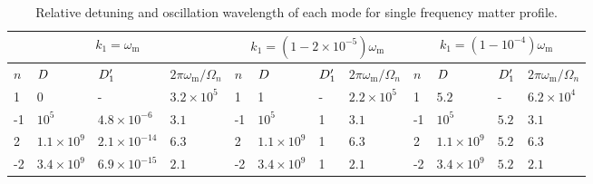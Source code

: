 


\begin{table}
\centering
\small
\setlength\tabcolsep{2pt}
\begin{tabular}{llll|llll|llll}
\hline
 \multicolumn{4}{c|}{$k_1=\omega_{\mathrm m}$} & \multicolumn{4}{c|}{$k_1=(1-2\times 10^{-5})\omega_{\mathrm{m}}$} & \multicolumn{4}{c}{$k_1=(1-10^{-4})\omega_{\mathrm m}$} \\
\hline
   $n$ & $D$ & $D'_1$  & $2\pi\omega_{\mathrm m}/\Omega_n$ & $n$ & $D$ & $D'_1$ & $2\pi\omega_{\mathrm m}/\Omega_n$ & $n$ & $D$ & $D'_1$ & $2\pi\omega_{\mathrm m}/\Omega_n$  \\
\hline
 1 &	0  & - &   $3.2\times10^5$   & 1 &	1 &  -  &   $2.2\times 10^5$       & 1   &	$5.2$ &  - & $6.2\times10^4$   \\
-1 &	$10^5$ &  $4.8\times 10^{-6}$  &   $3.1$     &     -1 &	$10^5$ &   1  &   $3.1$               &  -1 &	$10^5$  & $5.2$ & $3.1$  \\
2 &	$1.1\times 10^9$  &   $2.1\times 10^{-14}$  &   $6.3$    &  2 & 	$1.1\times 10^9$ &  1  &    $6.3$   &  2  &	$1.1\times 10^9$  &  $5.2$  & $6.3$  \\
-2 &	$3.4\times 10^9$  & $6.9\times 10^{-15}$ & $2.1$ &    -2 &	$3.4\times10^9$ &  1  &  $2.1$          & -2  &	$3.4\times 10^9$ & $5.2$ &  $2.1$  \\
\hline
\end{tabular}
\caption{\label{tab-q-values-single-frequency-example}Relative detuning and oscillation wavelength of each mode for single frequency matter profile.}
\end{table}




